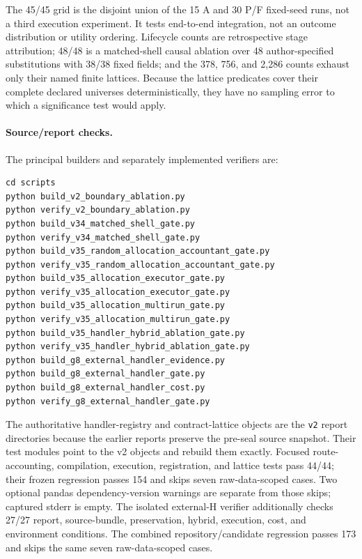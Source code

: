 \documentclass[letterpaper]{article}
\begin{document}
The 45/45 grid is the disjoint union of the 15 A and 30 P/F fixed-seed runs,
not a third execution experiment.  It tests end-to-end integration, not an
outcome distribution or utility ordering.  Lifecycle counts are retrospective
stage attribution; 48/48 is a matched-shell causal ablation over 48
author-specified substitutions with 38/38 fixed fields; and the 378, 756, and
2,286 counts exhaust only their named finite lattices.  Because the lattice
predicates cover their complete declared universes deterministically, they
have no sampling error to which a significance test would apply.

\paragraph{Source/report checks.}
The principal builders and separately implemented verifiers are:
{\scriptsize
\begin{verbatim}
cd scripts
python build_v2_boundary_ablation.py
python verify_v2_boundary_ablation.py
python build_v34_matched_shell_gate.py
python verify_v34_matched_shell_gate.py
python build_v35_random_allocation_accountant_gate.py
python verify_v35_random_allocation_accountant_gate.py
python build_v35_allocation_executor_gate.py
python verify_v35_allocation_executor_gate.py
python build_v35_allocation_multirun_gate.py
python verify_v35_allocation_multirun_gate.py
python build_v35_handler_hybrid_ablation_gate.py
python verify_v35_handler_hybrid_ablation_gate.py
python build_g8_external_handler_evidence.py
python build_g8_external_handler_gate.py
python build_g8_external_handler_cost.py
python verify_g8_external_handler_gate.py
\end{verbatim}
}
The authoritative handler-registry and contract-lattice objects are the
\texttt{v2} report directories because the earlier reports preserve the
pre-seal source snapshot.  Their test modules point to the v2 objects and
rebuild them exactly.  Focused route-accounting, compilation, execution,
registration, and lattice tests pass 44/44; their frozen regression passes 154
and skips seven raw-data-scoped cases.  Two optional
pandas dependency-version warnings are separate from those skips; captured
stderr is empty.  The isolated external-H verifier additionally checks 27/27 report,
source-bundle, preservation, hybrid, execution, cost, and environment
conditions.  The combined repository/candidate regression passes 173 and
skips the same seven raw-data-scoped cases.
\end{document}

